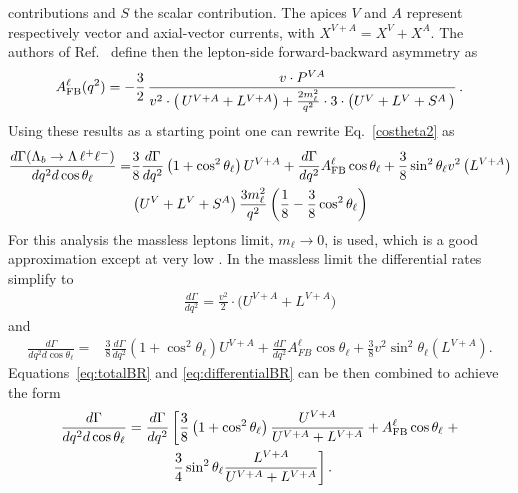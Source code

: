 contributions and $S$ the scalar contribution. The apices $V$ and $A$ represent respectively
vector and axial-vector currents, with $X^{V+A} = X^{V} + X^{A}$.
The authors of Ref.~\cite{Gutsche:2013pp} define then the lepton-side forward-backward asymmetry as
\begin{equation}
A_{\rm FB}^{\ell}(q^{2}) 
= - \frac{3}{2}\,\frac{v\cdot P^{VA}}
{v^{2}\cdot\big(\,U^{V+A}
+L^{V+A}\big)+\frac{2m_{\ell}^{2}}{q^{2}}\cdot 3 \cdot
\big(U^{V}+L^{V}
+S^{A}\,\big) }\,.
\label{eq:afbDef}
\end{equation}
%
%
%
Using these results as a starting point one can rewrite Eq.~\ref{costheta2} as
\begin{align}
\frac{d\Gamma(\Lambda_{b}\to \Lambda \,\ell^{+}\ell^{-})}{dq^2d\cos\theta_\ell}=&
\frac{3}{8}\frac{d\Gamma}{dq^2}\left(1+\cos^2\theta_\ell\right)U^{V+A}+
\frac{d\Gamma}{dq^2}A_{\rm FB}^\ell\cos\theta_\ell+
\frac{3}{8}\sin^2\theta_\ell v^2\left(L^{V+A}\right) \nonumber \\
&\left(U^{V}+L^{V}+S^{A}\right)\frac{3m_\ell^2}{q^2}\left(\frac{1}{8}-\frac{3}{8}\cos^2\theta_\ell\right)
\end{align}
For this analysis the massless leptons limit, $m_\ell \rightarrow 0$, is used, which is a good
approximation except at very low \qsq. In the massless limit the differential rates simplify to
\begin{eqnarray}
\frac{d\Gamma}{d q^2}=
\frac{v^{2}}{2}\cdot\bigg( U^{V+A} + L^{V+A} \bigg)
\label{eq:totalBR}
\end{eqnarray}
and
\begin{align}
\frac{d\Gamma}{dq^2d\cos\theta_\ell}=&
\frac{3}{8}\frac{d\Gamma}{dq^2}\left(1+\cos^2\theta_\ell\right)U^{V+A}+
\frac{d\Gamma}{dq^2}A_{FB}^\ell\cos\theta_\ell+
\frac{3}{8}v^2\sin^2\theta_\ell \left(L^{V+A}\right).
\label{eq:differentialBR}
\end{align}
%
%
Equations~\ref{eq:totalBR} and \ref{eq:differentialBR} can be then combined to achieve the form
\begin{align}
\frac{d\Gamma}{dq^2d\cos\theta_\ell}=
\frac{d\Gamma}{dq^2}&\left[
\frac{3}{8}\left(1+\cos^2\theta_\ell\right)\frac{U^{V+A}}{U^{V+A}+L^{V+A}}+A_{\rm FB}^\ell\cos\theta_\ell\right . +
 \nonumber \\
& \left. \frac{3}{4}\sin^2\theta_\ell\frac{L^{V+A}}{U^{V+A}+L^{V+A}}\right].
\end{align}
